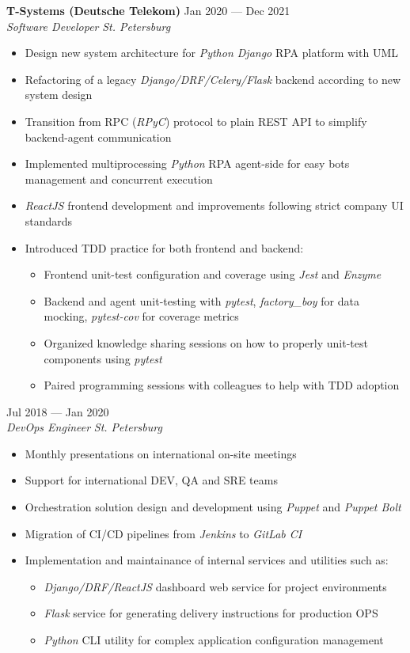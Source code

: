 \documentclass[10pt]{report}
\newenvironment{JobDescription}[5]{
    \vspace{ #5 }
    \flushleft
    {\bf #1 } \hfill { #2 }
    \\
    {\em #3 } \hfill {\em #4 }
    \begin{itemize}
} {
    \end{itemize}
}
\begin{document}
\begin{JobDescription}{T-Systems (Deutsche Telekom)}{Jan 2020 --- Dec 2021}{Software Developer}{St. Petersburg}{0mm}
    \item Design new system architecture for \emph{Python Django} RPA platform with UML
    \item Refactoring of a legacy \emph{Django/DRF/Celery/Flask} backend according to new system design
    \item Transition from RPC (\emph{RPyC}) protocol to plain REST API to simplify backend-agent communication
    \item Implemented multiprocessing \emph{Python} RPA agent-side for easy bots management and concurrent execution
    \item \emph{ReactJS} frontend development and improvements following strict company UI standards
    \item Introduced TDD practice for both frontend and backend:
    \begin{itemize}
        \item Frontend unit-test configuration and coverage using \emph{Jest} and \emph{Enzyme}
        \item Backend and agent unit-testing with \emph{pytest}, \emph{factory\_boy} for data mocking, \emph{pytest-cov}
            for coverage metrics
        \item Organized knowledge sharing sessions on how to properly unit-test components using \emph{pytest}
        \item Paired programming sessions with colleagues to help with TDD adoption
    \end{itemize}
\end{JobDescription}

\begin{JobDescription}{}{Jul 2018 --- Jan 2020}{DevOps Engineer}{St. Petersburg}{-3mm}
    \item Monthly presentations on international on-site meetings
    \item Support for international DEV, QA and SRE teams
    \item Orchestration solution design and development using \emph{Puppet} and \emph{Puppet Bolt}
    \item Migration of CI/CD pipelines from \emph{Jenkins} to \emph{GitLab CI}
    \item Implementation and maintainance of internal services and utilities such as:
    \begin{itemize}
        \item \emph{Django/DRF/ReactJS} dashboard web service for project environments \item \emph{Flask} service for generating delivery instructions for production OPS \item \emph{Python} CLI utility for complex application configuration management
    \end{itemize}
\end{JobDescription}
\end{document}
